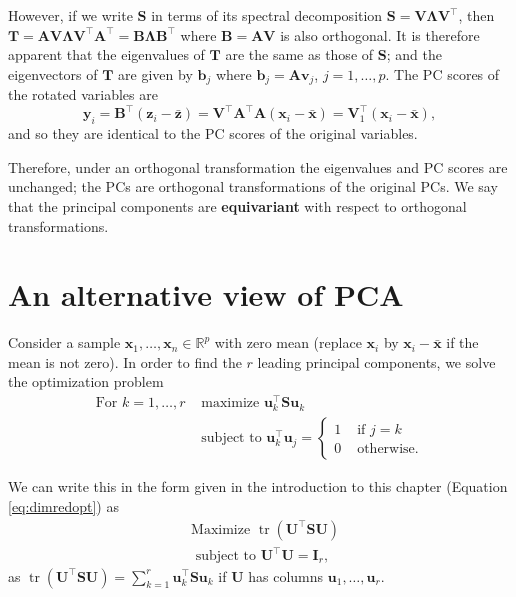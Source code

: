 \documentclass[]{book}
\theoremstyle{definition}
\theoremstyle{definition}
\theoremstyle{definition}
\theoremstyle{remark}
\begin{document}
However, if we write \(\mathbf S\) in terms of its spectral decomposition \(\mathbf S= \mathbf V\boldsymbol \Lambda\mathbf V^\top\), then \(\mathbf T= \mathbf A\mathbf V\boldsymbol \Lambda\mathbf V^\top \mathbf A^\top = \mathbf B\boldsymbol \Lambda\mathbf B^\top\) where \(\mathbf B= \mathbf A\mathbf V\) is also orthogonal. It is therefore apparent that the eigenvalues of \(\mathbf T\) are the same as those of \(\mathbf S\); and the eigenvectors of \(\mathbf T\) are given by \(\mathbf b_j\) where \(\mathbf b_j = \mathbf A\mathbf v_j\), \(j=1,\ldots,p\). The PC scores of the rotated variables are
\[ \mathbf y_i = \mathbf B^\top (\mathbf z_i - \bar{\mathbf z}) = \mathbf V^\top \mathbf A^\top \mathbf A(\mathbf x_i - \bar{\mathbf x}) = \mathbf V_1^\top (\mathbf x_i - \bar{\mathbf x}),\]
and so they are identical to the PC scores of the original variables.

Therefore, under an orthogonal transformation the eigenvalues and PC scores are unchanged; the PCs are orthogonal transformations of the original PCs. We say that the principal components are \textbf{equivariant} with respect to orthogonal transformations.

\hypertarget{an-alternative-view-of-pca}{%
\section{An alternative view of PCA}\label{an-alternative-view-of-pca}}

Consider a sample \(\mathbf x_1, \ldots , \mathbf x_n \in \mathbb{R}^p\) with zero mean (replace \(\mathbf x_i\) by \(\mathbf x_i-\bar{\mathbf x}\) if the mean is not zero). In order to find the \(r\) leading principal components, we solve the optimization problem
\begin{align*}
\mbox{For } k=1, \ldots, r &\mbox{ maximize } \mathbf u_k^\top \mathbf S\mathbf u_k \\
 &\mbox{ subject to } \mathbf u_k^\top \mathbf u_j = \begin{cases}
 1  &\mbox{ if } j=k\\
 0 & \mbox{ otherwise.}
 \end{cases}
 \end{align*}

We can write this in the form given in the introduction to this chapter (Equation \eqref{eq:dimredopt}) as
\begin{align*}
&\mbox{Maximize } \operatorname{tr}(\mathbf U^\top \mathbf S\mathbf U) \\
 &\mbox{ subject to } \mathbf U^\top \mathbf U=\mathbf I_r,
 \end{align*}
as \(\operatorname{tr}(\mathbf U^\top \mathbf S\mathbf U) = \sum_{k=1}^r \mathbf u_k^\top \mathbf S\mathbf u_k\) if \(\mathbf U\) has columns \(\mathbf u_1, \ldots, \mathbf u_r\).
\end{document}
